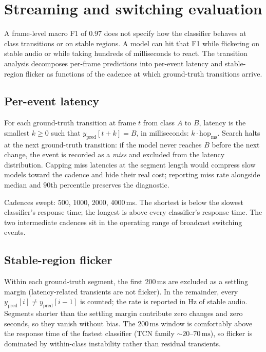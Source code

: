 \section{Streaming and switching evaluation}
\label{sec:eval_streaming}

A frame-level macro F1 of $0.97$ does not specify how the classifier behaves at class transitions or on stable regions.
A model can hit that F1 while flickering on stable audio or while taking hundreds of milliseconds to react.
The transition analysis decomposes per-frame predictions into per-event latency and stable-region flicker as functions of the cadence at which ground-truth transitions arrive.

\subsection*{Per-event latency}

For each ground-truth transition at frame $t$ from class $A$ to $B$, latency is the smallest $k \geq 0$ such that $y_{\text{pred}}[t + k] = B$, in milliseconds: $k \cdot \text{hop}_{\text{ms}}$.
Search halts at the next ground-truth transition: if the model never reaches $B$ before the next change, the event is recorded as a \emph{miss} and excluded from the latency distribution.
Capping miss latencies at the segment length would compress slow models toward the cadence and hide their real cost; reporting miss rate alongside median and $90$th percentile preserves the diagnostic.

Cadences swept: 500, 1000, 2000, 4000\,ms.
The shortest is below the slowest classifier's response time; the longest is above every classifier's response time.
The two intermediate cadences sit in the operating range of broadcast switching events.

\subsection*{Stable-region flicker}

Within each ground-truth segment, the first $200\,\text{ms}$ are excluded as a settling margin (latency-related transients are not flicker).
In the remainder, every $y_{\text{pred}}[i] \neq y_{\text{pred}}[i-1]$ is counted; the rate is reported in Hz of stable audio.
Segments shorter than the settling margin contribute zero changes and zero seconds, so they vanish without bias.
The $200\,\text{ms}$ window is comfortably above the response time of the fastest classifier (TCN family $\sim 20$--$70\,\text{ms}$), so flicker is dominated by within-class instability rather than residual transients.

